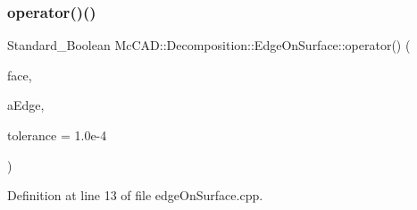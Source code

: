 \subsubsection{\texorpdfstring{operator()()}{operator()()}\hspace{0.1cm}{\footnotesize\ttfamily [1/2]}}
{\footnotesize\ttfamily Standard\+\_\+\+Boolean Mc\+C\+A\+D\+::\+Decomposition\+::\+Edge\+On\+Surface\+::operator() (\begin{DoxyParamCaption}\item[{const Topo\+D\+S\+\_\+\+Face \&}]{face,  }\item[{const \hyperlink{classMcCAD_1_1Geometry_1_1Edge}{Mc\+C\+A\+D\+::\+Geometry\+::\+Edge} \&}]{a\+Edge,  }\item[{Standard\+\_\+\+Real}]{tolerance = {\ttfamily 1.0e-\/4} }\end{DoxyParamCaption})}



Definition at line 13 of file edge\+On\+Surface.\+cpp.


